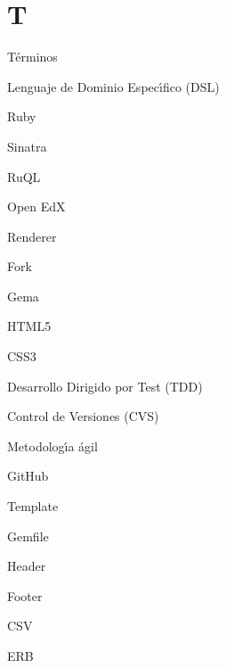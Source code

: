 \section{T}
\label{Apendice1:T}

T\'erminos
\bigskip

Lenguaje de Dominio Espec\'{\i}fico (DSL)
\bigskip

Ruby
\bigskip

Sinatra
\bigskip

RuQL
\bigskip

Open EdX
\bigskip

Renderer
\bigskip

Fork
\bigskip

Gema
\bigskip


HTML5
\bigskip

CSS3
\bigskip

Desarrollo Dirigido por Test (TDD)
\bigskip

Control de Versiones (CVS)
\bigskip

Metodolog\'{\i}a \'agil
\bigskip

GitHub
\bigskip

Template
\bigskip

Gemfile
\bigskip

Header
\bigskip

Footer
\bigskip

CSV
\bigskip

ERB
\bigskip
